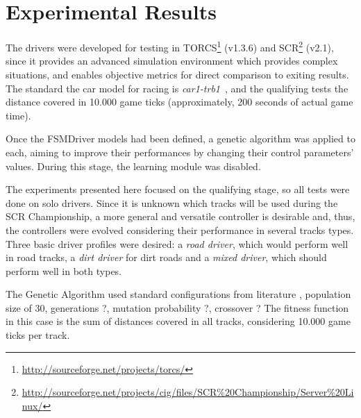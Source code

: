 \section{Experimental Results}\label{sec:4}%


The drivers were developed for testing in TORCS\footnote{\url{http://sourceforge.net/projects/torcs/}} (v1.3.6) and
SCR\footnote{\url{http://sourceforge.net/projects/cig/files/SCR\%20Championship/Server\%20Linux/}} (v2.1), since it provides an advanced simulation environment which provides complex situations, and enables objective metrics for direct comparison to exiting results. The standard the car model for racing is \emph{car1-trb1}~\cite{??}, and the qualifying tests the distance covered in 10.000 game ticks (approximately, 200 seconds of actual game time).

Once the FSMDriver models had been defined, a genetic algorithm was applied to each, aiming to improve their performances by changing their control parameters' values. During this stage, the learning module was disabled.


The experiments presented here focused on the qualifying stage, so all tests were done on solo drivers. Since it is unknown which tracks will be used during the SCR Championship, a more general and versatile controller is desirable and, thus, the controllers were evolved considering their performance in several tracks types. Three basic driver profiles were desired: a \emph{road driver}, which would perform well in road tracks, a \emph{dirt driver} for dirt roads and a \emph{mixed driver}, which should perform well in both types.

The Genetic Algorithm used standard configurations from literature , population size of 30, generations ?, mutation probability ?, crossover ?   %
The fitness function in this case is the sum of distances covered in all tracks, considering 10.000 game ticks per track.

